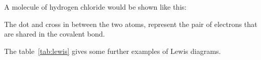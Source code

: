 A molecule of hydrogen chloride would be shown like this:
\begin{center}
\end{center}

      \par 
      \label{m38701*id140178}The dot and cross in between the two atoms, represent the pair of electrons that are shared in the covalent bond.\par 
The table~\ref{tab:lewis} gives some further examples of Lewis diagrams.
